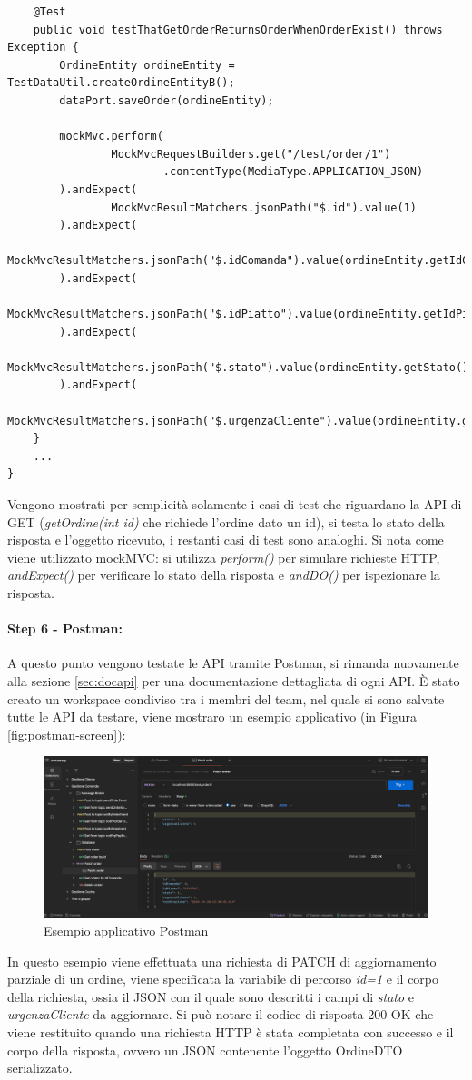 \begin{lstlisting}
    @Test
    public void testThatGetOrderReturnsOrderWhenOrderExist() throws Exception {
        OrdineEntity ordineEntity = TestDataUtil.createOrdineEntityB();
        dataPort.saveOrder(ordineEntity);

        mockMvc.perform(
                MockMvcRequestBuilders.get("/test/order/1")
                        .contentType(MediaType.APPLICATION_JSON)
        ).andExpect(
                MockMvcResultMatchers.jsonPath("$.id").value(1)
        ).andExpect(
                MockMvcResultMatchers.jsonPath("$.idComanda").value(ordineEntity.getIdComanda())
        ).andExpect(
                MockMvcResultMatchers.jsonPath("$.idPiatto").value(ordineEntity.getIdPiatto())
        ).andExpect(
                MockMvcResultMatchers.jsonPath("$.stato").value(ordineEntity.getStato())
        ).andExpect(
                MockMvcResultMatchers.jsonPath("$.urgenzaCliente").value(ordineEntity.getUrgenzaCliente()));
    }
    ...
}
\end{lstlisting}
Vengono mostrati per semplicità solamente i casi di test che riguardano la API di GET (\textit{getOrdine(int id)} che richiede l'ordine dato un id), si testa lo stato della risposta e l'oggetto ricevuto, i restanti casi di test sono analoghi.
Si nota come viene utilizzato mockMVC: si utilizza \textit{perform()} per simulare richieste HTTP, \textit{andExpect()} per verificare lo stato della risposta e \textit{andDO()} per ispezionare la risposta.
\paragraph{Step 6 - Postman:}
A questo punto vengono testate le API tramite Postman, si rimanda nuovamente alla sezione \vref{sec:docapi} per una documentazione dettagliata di ogni API.
È stato creato un workspace condiviso tra i membri del team, nel quale si sono salvate tutte le API da testare, viene mostraro un esempio applicativo (in Figura \vref{fig:postman-screen}):
\begin{figure}[H]
    \centering
    \includegraphics[width=1\linewidth]{iterazione1/images/postman-screen.png}
    \caption{Esempio applicativo Postman}
    \label{fig:postman-screen}
\end{figure}
In questo esempio viene effettuata una richiesta di PATCH di aggiornamento parziale di un ordine, viene specificata la variabile di percorso \textit{id=1} e il corpo della richiesta, ossia il JSON con il quale sono descritti i campi di \textit{stato} e \textit{urgenzaCliente} da aggiornare. Si può notare il codice di risposta 200 OK che viene restituito quando una richiesta HTTP è stata completata con successo e il corpo della risposta, ovvero un JSON contenente l'oggetto OrdineDTO serializzato.
\clearpage
